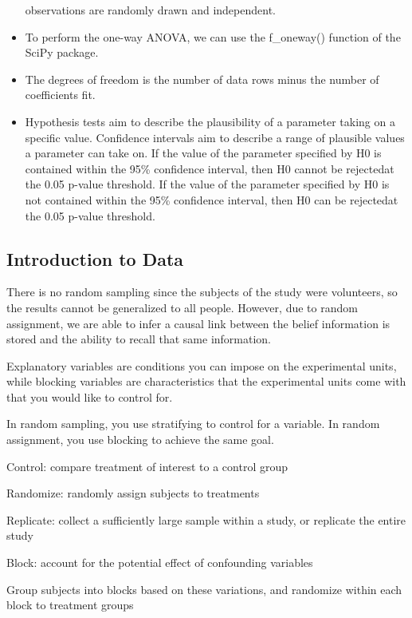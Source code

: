 \documentclass[]{book}
\theoremstyle{definition}
\theoremstyle{definition}
\theoremstyle{definition}
\theoremstyle{remark}
\begin{document}
\begin{itemize}
  observations are randomly drawn and independent.
\item
  To perform the one-way ANOVA, we can use the f\_oneway() function of
  the SciPy package.
\item
  The degrees of freedom is the number of data rows minus the number of
  coefficients fit.
\item
  Hypothesis tests aim to describe the plausibility of a parameter
  taking on a specific value. Confidence intervals aim to describe a
  range of plausible values a parameter can take on. If the value of the
  parameter specified by H0 is contained within the 95\% confidence
  interval, then H0 cannot be rejectedat the 0.05 p-value threshold. If
  the value of the parameter specified by H0 is not contained within the
  95\% confidence interval, then H0 can be rejectedat the 0.05 p-value
  threshold.
\end{itemize}

\subsection*{Introduction to Data}\label{introduction-to-data}

There is no random sampling since the subjects of the study were
volunteers, so the results cannot be generalized to all people. However,
due to random assignment, we are able to infer a causal link between the
belief information is stored and the ability to recall that same
information.

Explanatory variables are conditions you can impose on the experimental
units, while blocking variables are characteristics that the
experimental units come with that you would like to control for.

In random sampling, you use stratifying to control for a variable. In
random assignment, you use blocking to achieve the same goal.

Control: compare treatment of interest to a control group

Randomize: randomly assign subjects to treatments

Replicate: collect a sufficiently large sample within a study, or
replicate the entire study

Block: account for the potential effect of confounding variables

Group subjects into blocks based on these variations, and randomize
within each block to treatment groups
\end{document}
